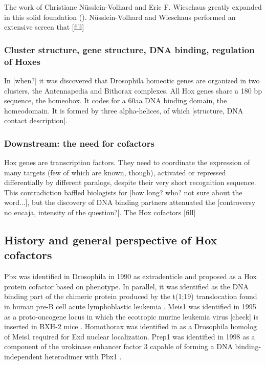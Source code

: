 The work of Christiane Nüsslein-Volhard and Eric F. Wieschaus greatly expanded in this solid foundation (\cite{Nuesslein-Volhard1980}). Nüsslein-Volhard and Wieschaus performed an extensive screen that [fill]




\subsubsection{Cluster structure, gene structure, DNA binding, regulation of Hoxes}


In [when?] it was discovered that Drosophila homeotic genes are organized in two clusters, the Antennapedia \cite{Kaufman1990} and Bithorax \cite{Lewis1978}complexes.
All Hox genes share a 180 bp sequence, the homeobox. It codes for a 60aa DNA binding domain, the homeodomain. It is formed by three alpha-helices, of which [structure, DNA contact description].

\subsubsection{Downstream: the need for cofactors}
Hox genes are transcription factors. They need to coordinate the expression of many targets (few of which are known, though), activated or repressed differentially by different paralogs, despite their very short recognition sequence. This contradiction baffled biologists for [how long? who? not sure about the word...], but the discovery of DNA binding partners attenuated the [controversy no encaja, intensity of the question?]. The Hox cofactors [fill]

\subsection{History and general perspective of Hox cofactors}

Pbx was identified in Drosophila in 1990 as extradenticle \cite{Peifer1990} and proposed as a Hox protein cofactor based on phenotype. In parallel, it was identified as the DNA binding part of the chimeric protein produced by the t(1;19) translocation found in human pre-B cell acute lymphoblastic leukemia \cite{Kamps1990}. 
Meis1 was identified in 1995 as a proto-oncogene locus in which the ecotropic murine leukemia virus [check] is inserted in BXH-2 mice \cite{Moskow1995}. Homothorax was identified in \cite{Rauskolb1995, Rieckhof1997} as a Drosophila homolog of Meis1 required for Exd nuclear localization. 
Prep1 was identified in 1998 as a component of the urokinase enhancer factor 3 capable of forming a DNA binding-independent heterodimer with Pbx1 \cite{Berthelsen1998}.

